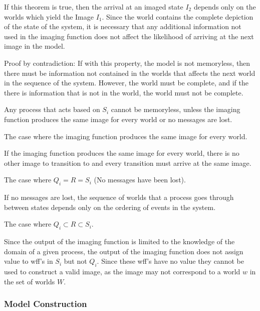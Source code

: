 If this theorem is true, then the arrival at an imaged state $I_2$ depends only on the worlds which yield the Image $I_1$. Since the world contains the complete depiction of the state of the system, it is necessary that any additional information not used in the imaging function does not affect the likelihood of arriving at the next image in the model.

Proof by contradiction: If with this property, the model is not memoryless, then there must be information not contained in the worlds that affects the next world in the sequence of the system. However, the world must be complete, and if the there is information that is not in the world, the world must not be complete.

\begin{thm}
Any process that acts based on $S_i$ cannot be memoryless, unless the imaging function produces the same image for every world or no messages are lost.
\end{thm}

\begin{case}
The case where the imaging function produces the same image for every world.
\end{case}

If the imaging function produces the same image for every world, there is no other image to transition to and every transition must arrive at the same image.

\begin{case}
The case where $Q_i = R = S_i$ (No messages have been lost).
\end{case}

If no messages are lost, the sequence of worlds that a process goes through between states depends only on the ordering of events in the system. 

\begin{case}
The case where $Q_i \subset R \subset S_i$.
\end{case}

Since the output of the imaging function is limited to the knowledge of the domain of a given process, the output of the imaging function does not assign value to wff's in $S_i$ but not $Q_i$. Since these wff's have no value they cannot be used to construct a valid image, as the image may not correspond to a world $w$ in the set of worlds $W$.


\subsubsection{Model Construction}

